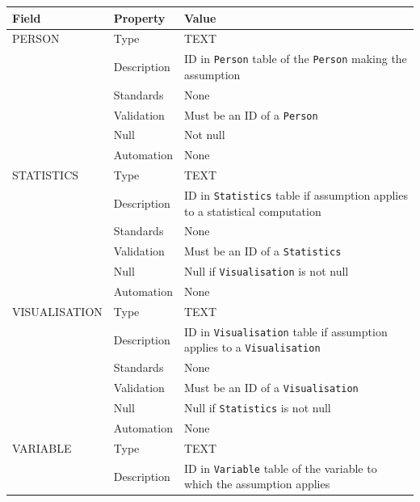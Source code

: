 \documentclass[
]{article}
\newcounter{none} %
\begin{document}
{\def\LTcaptype{none} %
\begin{longtable}[]{@{}
  >{\raggedright\arraybackslash}p{}
  >{\raggedright\arraybackslash}p{}
  >{\raggedright\arraybackslash}p{}@{}}
\toprule\noalign{}
\begin{minipage}[b]{\linewidth}\raggedright
Field
\end{minipage} & \begin{minipage}[b]{\linewidth}\raggedright
Property
\end{minipage} & \begin{minipage}[b]{\linewidth}\raggedright
Value
\end{minipage} \\
\midrule\noalign{}
\endhead
\bottomrule\noalign{}
\endlastfoot
PERSON & Type & TEXT \\
& Description & ID in \texttt{Person} table of the \texttt{Person}
making the assumption \\
& Standards & None \\
& Validation & Must be an ID of a \texttt{Person} \\
& Null & Not null \\
& Automation & None \\
STATISTICS & Type & TEXT \\
& Description & ID in \texttt{Statistics} table if assumption applies to
a statistical computation \\
& Standards & None \\
& Validation & Must be an ID of a \texttt{Statistics} \\
& Null & Null if \texttt{Visualisation} is not null \\
& Automation & None \\
VISUALISATION & Type & TEXT \\
& Description & ID in \texttt{Visualisation} table if assumption applies
to a \texttt{Visualisation} \\
& Standards & None \\
& Validation & Must be an ID of a \texttt{Visualisation} \\
& Null & Null if \texttt{Statistics} is not null \\
& Automation & None \\
VARIABLE & Type & TEXT \\
& Description & ID in \texttt{Variable} table of the variable to which
the assumption applies \\

\end{longtable}}
\end{document}
